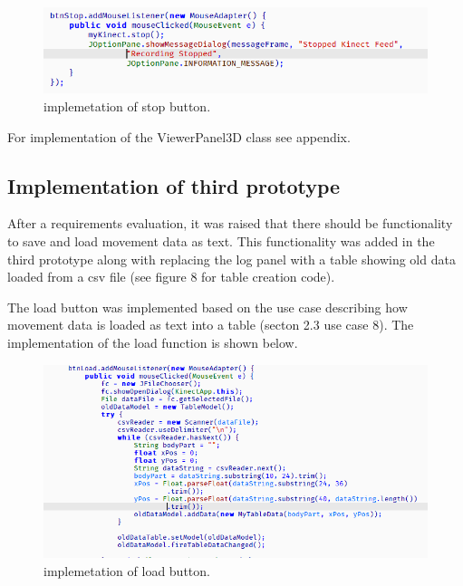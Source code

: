 \documentclass[a4paper, 12pt]{article}
\begin{document}
\begin{figure}[!htb]
	\begin{center}
  \includegraphics[scale=0.7]{codesnippet16.png}
  	\caption{implemetation of stop button.}
  \end{center} 
  \label{fig: codesnippet15} 
\end{figure}

For implementation of the ViewerPanel3D class see appendix.

\subsection{Implementation of third prototype}

After a requirements evaluation, it was raised that there should be functionality to save and load movement data as text. This functionality was added in the third prototype along with replacing the log panel with a table showing old data loaded from a csv file  (see figure 8 for table creation code).

The load button was implemented based on the use case describing how movement data is loaded as text into a table (secton 2.3 use case 8). The implementation of the load function is shown below. 

\begin{figure}[!htb]
	\begin{center}
  \includegraphics[scale=0.8]{codesnippet18.png}
  	\caption{implemetation of load button.}
  \end{center} 
  \label{fig: codesnippet17} 
\end{figure}
\end{document}
